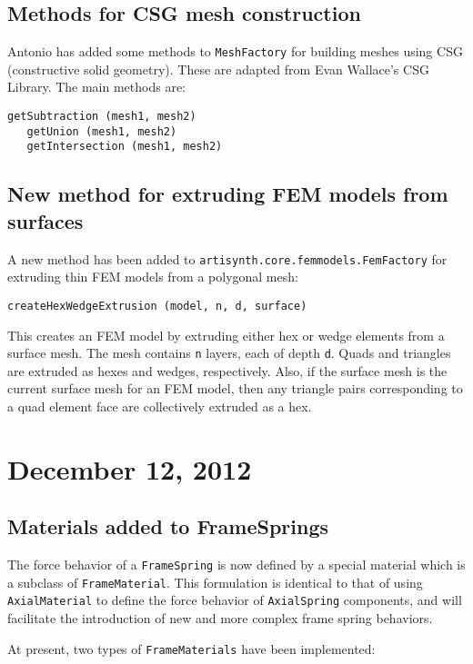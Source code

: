\documentclass{article}
\begin{document}
\subsection*{Methods for CSG mesh construction}

Antonio has added some methods to {\tt MeshFactory} for building
meshes using CSG (constructive solid geometry). These are adapted from
Evan Wallace's CSG Library. The main methods are:
\begin{lstlisting}[]
   getSubtraction (mesh1, mesh2)
   getUnion (mesh1, mesh2)
   getIntersection (mesh1, mesh2)
\end{lstlisting}

\subsection*{New method for extruding FEM models from surfaces}

A new method has been added to {\tt artisynth.core.femmodels.FemFactory}
for extruding thin FEM models from a polygonal mesh:
\begin{lstlisting}[]
   createHexWedgeExtrusion (model, n, d, surface)
\end{lstlisting}
This creates an FEM model by extruding either hex or wedge elements
from a surface mesh. The mesh contains {\tt n} layers, each of depth
{\tt d}. Quads and triangles are extruded as hexes and wedges,
respectively.  Also, if the surface mesh is the current surface mesh
for an FEM model, then any triangle pairs corresponding to a quad
element face are collectively extruded as a hex.

\section*{December 12, 2012}

\subsection*{Materials added to FrameSprings}

The force behavior of a {\tt FrameSpring} is now defined by a special
material which is a subclass of {\tt FrameMaterial}. This formulation
is identical to that of using {\tt AxialMaterial} to define the force
behavior of {\tt AxialSpring} components, and will facilitate the
introduction of new and more complex frame spring behaviors.

At present, two types of {\tt FrameMaterials} have been implemented:
\end{document}
